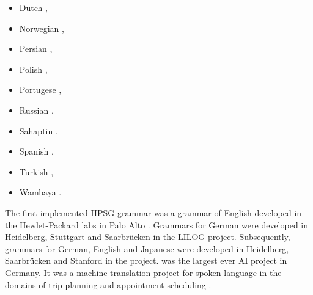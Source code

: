 \begin{itemize}
\citep*{Liu97a,%
Ng97a,%
ML2009a,ML2013a,FSB2015a-u},
\item Dutch \citep*{NB94,BvNM2001a-u,Fokkens2011a},
\item Norwegian \citep{HH2004a-u,BH2004a-u,HB2006a-u}, 
\item Persian \citep{MuellerPersian,MG2010a},
\item Polish \citep*{PKMM2002a-u,MMPK2003a-u}, %
\item Portugese \citep{BC2008a-u,BC2008b-single-quotes,CB2010a-u},
\item Russian \citep{AZ2009a-u}, %
\item Sahaptin \citep{Drellishak2009a-u}, %
\item Spanish
  \citep*{PinedaMeza2005-u,PinedaMeza2005b-u,Bildhauer2008a,Marimon2013a-u%
}, 
\item Turkish \citep*{FPB09a-u},
\item Wambaya \citep{Bender2008b-u,Bender2008a,Bender2010a-u}.
\end{itemize}
The first implemented HPSG grammar was a grammar of English developed in the Hewlet-Packard labs in Palo Alto
\citep*{FPW85a,Flickinger87}. Grammars for German were developed in Heidelberg, Stuttgart and
Saarbrücken in the LILOG project. Subsequently, grammars for German, English and Japanese were
developed in Heidelberg, Saarbrücken and Stanford in the \verbmobil project. \verbmobil was the
largest ever AI project in Germany. It was a machine translation project for spoken language in the
domains of trip planning and appointment scheduling \citep{Wahlster2000a-ed}.

